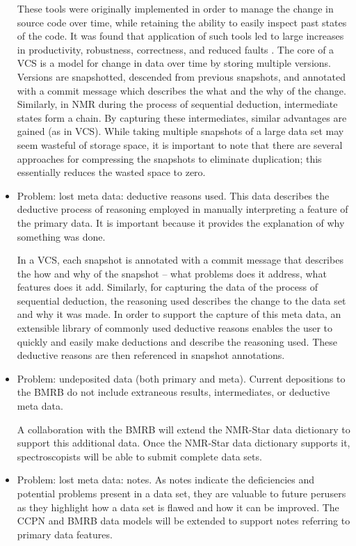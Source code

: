 \begin{itemize}
  These tools were originally implemented in order to manage the change in 
  source code over time, while retaining the ability to easily inspect past 
  states of the code.  It was found that application of such tools led to 
  large increases in productivity, robustness, correctness, and reduced 
  faults \cite{fischer2003vcs}.  The core of a VCS is a model for change in data 
  over time by storing multiple versions.  Versions are snapshotted, 
  descended from previous snapshots, and annotated with a commit message 
  which describes the what and the why of the change.  Similarly, in NMR 
  during the process of sequential deduction, intermediate states form a 
  chain.  By capturing these intermediates, similar advantages are gained 
  (as in VCS).  While taking multiple snapshots of a large data set may 
  seem wasteful of storage space, it is important to note that there are 
  several approaches for compressing the snapshots to eliminate duplication; 
  this essentially reduces the wasted space to zero.

  \item Problem: lost meta data: deductive reasons used.  This data describes the 
  deductive process of reasoning employed in manually interpreting a feature 
  of the primary data.  It is important because it provides the explanation 
  of why something was done.

  In a VCS, each snapshot is annotated with a commit message that describes 
  the how and why of the snapshot -- what problems does it address, what 
  features does it add.  Similarly, for capturing the data of the process of 
  sequential deduction, the reasoning used describes the change to the data 
  set and why it was made.  In order to support the capture of this meta data, 
  an extensible library of commonly used deductive reasons enables the user to 
  quickly and easily make deductions and describe the reasoning used.  These 
  deductive reasons are then referenced in snapshot annotations.

  \item Problem: undeposited data (both primary and meta).  
  Current depositions to the BMRB do not include extraneous 
  results, intermediates, or deductive meta data.  

  A collaboration with the BMRB will extend the NMR-Star data dictionary to 
  support this additional data.  Once the NMR-Star data dictionary supports 
  it, spectroscopists will be able to submit complete data sets.

  \item Problem: lost meta data: notes.  As notes indicate the deficiencies and 
  potential problems present in a data set, they are valuable to future 
  perusers as they highlight how a data set is flawed and how it can be improved.
  The CCPN and BMRB data models will be extended to support notes referring
  to primary data features.
\end{itemize}

